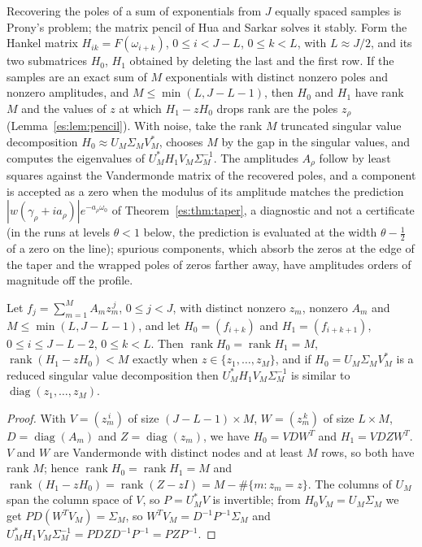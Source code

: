 Recovering the poles of a sum of exponentials from $J$ equally spaced samples is Prony's problem; the matrix pencil of Hua and Sarkar \cite{HuaSarkar90} solves it stably. Form the Hankel matrix $H_{ik}=F(\omega_{i+k})$, $0\le i<J-L$, $0\le k<L$, with $L\approx J/2$, and its two submatrices $H_0$, $H_1$ obtained by deleting the last and the first row. If the samples are an exact sum of $M$ exponentials with distinct nonzero poles and nonzero amplitudes, and $M\le\min(L,J-L-1)$, then $H_0$ and $H_1$ have rank $M$ and the values of $z$ at which $H_1-zH_0$ drops rank are the poles $z_\rho$ (Lemma~\ref{es:lem:pencil}). With noise, take the rank $M$ truncated singular value decomposition $H_0\approx U_M\Sigma_MV_M^*$, chooses $M$ by the gap in the singular values, and computes the eigenvalues of $U_M^*H_1V_M\Sigma_M^{-1}$. The amplitudes $A_\rho$ follow by least squares against the Vandermonde matrix of the recovered poles, and a component is accepted as a zero when the modulus of its amplitude matches the prediction $|w(\gamma_\rho+ia_\rho)|e^{-a_\rho\omega_0}$ of Theorem~\ref{es:thm:taper}, a diagnostic and not a certificate (in the runs at levels $\theta<1$ below, the prediction is evaluated at the width $\theta-\tfrac12$ of a zero on the line); spurious components, which absorb the zeros at the edge of the taper and the wrapped poles of zeros farther away, have amplitudes orders of magnitude off the profile.

\begin{lemma}\label{es:lem:pencil}
Let $f_j=\sum_{m=1}^MA_mz_m^{\,j}$, $0\le j<J$, with distinct nonzero $z_m$, nonzero $A_m$ and $M\le\min(L,J-L-1)$, and let $H_0=(f_{i+k})$ and $H_1=(f_{i+k+1})$, $0\le i\le J-L-2$, $0\le k<L$. Then $\operatorname{rank}H_0=\operatorname{rank}H_1=M$, $\operatorname{rank}(H_1-zH_0)<M$ exactly when $z\in\{z_1,\dots,z_M\}$, and if $H_0=U_M\Sigma_MV_M^*$ is a reduced singular value decomposition then $U_M^*H_1V_M\Sigma_M^{-1}$ is similar to $\operatorname{diag}(z_1,\dots,z_M)$.
\end{lemma}

\begin{proof}
With $V=(z_m^{\,i})$ of size $(J-L-1)\times M$, $W=(z_m^{\,k})$ of size $L\times M$, $D=\operatorname{diag}(A_m)$ and $Z=\operatorname{diag}(z_m)$, we have $H_0=VDW^{T}$ and $H_1=VDZW^{T}$. $V$ and $W$ are Vandermonde with distinct nodes and at least $M$ rows, so both have rank $M$; hence $\operatorname{rank}H_0=\operatorname{rank}H_1=M$ and $\operatorname{rank}(H_1-zH_0)=\operatorname{rank}(Z-zI)=M-\#\{m:z_m=z\}$. The columns of $U_M$ span the column space of $V$, so $P=U_M^*V$ is invertible; from $H_0V_M=U_M\Sigma_M$ we get $PD(W^TV_M)=\Sigma_M$, so $W^TV_M=D^{-1}P^{-1}\Sigma_M$ and $U_M^*H_1V_M\Sigma_M^{-1}=PDZD^{-1}P^{-1}=PZP^{-1}$.
\end{proof}

